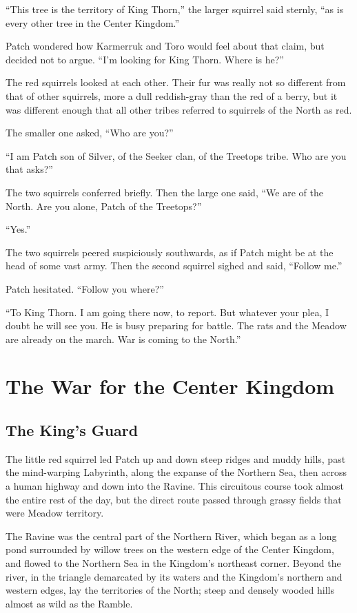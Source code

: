 \documentclass[ebook,oneside,openany,17pt]{memoir}
\newenvironment{tolerant}[1]{%
  \par\tolerance=#1\relax
}{%
  \par
}
\renewcommand{\thechapter}{\Roman{chapter}}
\newcounter{sections}
\newcommand{\sections}[1]{%
  \section*{#1}
  \addtocounter{sections}{1}%
  \pdfbookmark[1]{#1}{section.\thechapter.\thesections}}
\begin{document}
“This tree is the territory of King Thorn,” the larger squirrel said
sternly, “as is every other tree in the Center Kingdom.”

Patch wondered how Karmerruk and Toro would feel about that claim, but
decided not to argue. “I’m looking for King Thorn. Where is he?”

The red squirrels looked at each other. Their fur was really not so
different from that of other squirrels, more a dull reddish-gray than
the red of a berry, but it was different enough that all other tribes
referred to squirrels of the North as red.

The smaller one asked, “Who are you?”

“I am Patch son of Silver, of the Seeker clan, of the Treetops
tribe. Who are you that asks?”

\begin{tolerant}{500}
The two squirrels conferred briefly. Then the large one said, “We are
of the North. Are you alone, Patch of the Treetops?”
\end{tolerant}

“Yes.”

\begin{tolerant}{5000}
The two squirrels peered suspiciously south\-wards, as if Patch might be
at the head of some vast army. Then the second squirrel sighed and
said, “Follow me.”
\end{tolerant}

Patch hesitated. “Follow you where?”

“To King Thorn. I am going there now, to report. But whatever your
plea, I doubt he will see you. He is busy preparing for battle. The
rats and the Meadow are already on the march. War is coming to the
North.”


\chapter{The War for the Center Kingdom}

\sections{The King’s Guard}

The little red squirrel led Patch up and down steep ridges and muddy
hills, past the mind-warping Labyrinth, along the expanse of the
Northern Sea, then across a human highway and down into the
Ravine. This circuitous course took almost the entire rest of the day,
but the direct route passed through grassy fields that were Meadow
territory.

The Ravine was the central part of the Northern River, which began as
a long pond surrounded by willow trees on the western edge of the
Center Kingdom, and flowed to the Northern Sea in the Kingdom’s
northeast corner. Beyond the river, in the triangle demarcated by its
waters and the Kingdom’s northern and western edges, lay the
territories of the North; steep and densely wooded hills almost as
wild as the Ramble.
\end{document}
